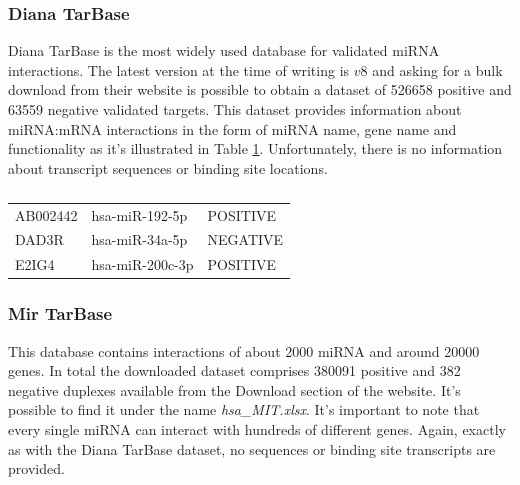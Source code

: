 \subsubsection{Diana TarBase}
Diana TarBase is the most widely used database for validated miRNA interactions. The latest version at the time of writing is $v8$ and asking for a bulk download from their website is possible to obtain a dataset of 526658 positive and 63559 negative validated targets. This dataset provides information about miRNA:mRNA interactions in the form of miRNA name, gene name and functionality as it's illustrated in Table \ref{tab:Diana}. Unfortunately, there is no information about transcript sequences or binding site locations.

\begin{table}[!t]
	\caption{}
	\label{tab:Diana}
	\centering
	\begin{tabular}{l l l}
		\toprule
		\tabhead{gene name} & \tabhead{miRNA name} & \tabhead{functionality} \\
		\midrule
		AB002442 & hsa-miR-192-5p & POSITIVE\\
		DAD3R & hsa-miR-34a-5p & NEGATIVE\\
		E2IG4 & hsa-miR-200c-3p & POSITIVE\\
		\bottomrule
	\end{tabular}
\end{table}

\subsubsection{Mir TarBase}
This database contains interactions of about 2000 miRNA and around 20000 genes. In total the downloaded dataset comprises 380091 positive and 382 negative duplexes available from the Download section of the website. It's possible to find it under the name \textit{hsa\_MIT.xlsx}. It's important to note that every single miRNA can interact with hundreds of different genes. Again, exactly as with the Diana TarBase dataset, no sequences or binding site transcripts are provided.
 
